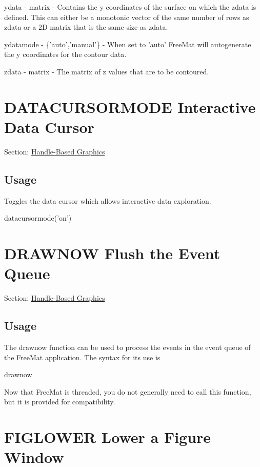 \begin{DoxyItemize}
\item {\ttfamily ydata} -\/ {\ttfamily matrix} -\/ Contains the y coordinates of the surface on which the zdata is defined. This can either be a monotonic vector of the same number of rows as {\ttfamily zdata} or a 2\-D matrix that is the same size as {\ttfamily zdata}.  
\item {\ttfamily ydatamode} -\/ {\ttfamily \{'auto','manual'\}} -\/ When set to {\ttfamily 'auto'} Free\-Mat will autogenerate the y coordinates for the contour data.  
\item {\ttfamily zdata} -\/ {\ttfamily matrix} -\/ The matrix of z values that are to be contoured.  
\end{DoxyItemize}\hypertarget{handle_datacursormode}{}\section{D\-A\-T\-A\-C\-U\-R\-S\-O\-R\-M\-O\-D\-E Interactive Data Cursor}\label{handle_datacursormode}
Section\-: \hyperlink{sec_handle}{Handle-\/\-Based Graphics} \hypertarget{vtkwidgets_vtkxyplotwidget_Usage}{}\subsection{Usage}\label{vtkwidgets_vtkxyplotwidget_Usage}
Toggles the data cursor which allows interactive data exploration. \begin{DoxyVerb}   datacursormode('on')
\end{DoxyVerb}
 \hypertarget{handle_drawnow}{}\section{D\-R\-A\-W\-N\-O\-W Flush the Event Queue}\label{handle_drawnow}
Section\-: \hyperlink{sec_handle}{Handle-\/\-Based Graphics} \hypertarget{vtkwidgets_vtkxyplotwidget_Usage}{}\subsection{Usage}\label{vtkwidgets_vtkxyplotwidget_Usage}
The {\ttfamily drawnow} function can be used to process the events in the event queue of the Free\-Mat application. The syntax for its use is \begin{DoxyVerb}   drawnow
\end{DoxyVerb}
 Now that Free\-Mat is threaded, you do not generally need to call this function, but it is provided for compatibility. \hypertarget{handle_figlower}{}\section{F\-I\-G\-L\-O\-W\-E\-R Lower a Figure Window}\label{handle_figlower}
